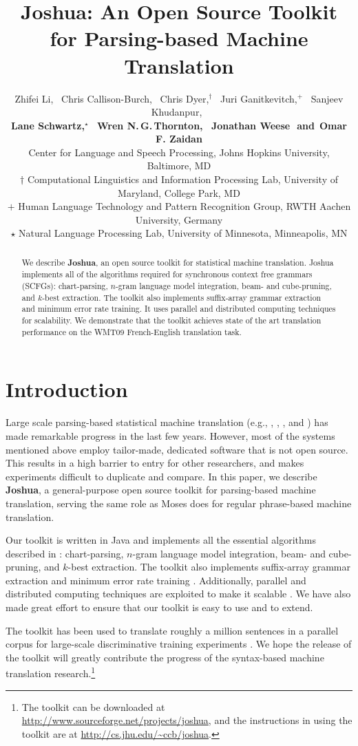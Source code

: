 \documentclass[11pt]{article}
\title{Joshua: An Open Source Toolkit for Parsing-based Machine Translation}
\author{
Zhifei Li,\,\,\,
Chris Callison-Burch,\,\,\, %
Chris Dyer,$^\dagger$\,\,\,
Juri Ganitkevitch,$^+$\,\,\,
Sanjeev Khudanpur,\,\,\, \\
{\bf Lane Schwartz,$^\star$\,\,\,
Wren N.\,G.\,Thornton,\,\,\,
Jonathan Weese\,\,
{\textnormal{and}}\,\,\,Omar F. Zaidan}\\
Center for Language and Speech Processing, Johns Hopkins University, Baltimore, MD\\
$\dagger$ Computational Linguistics and Information Processing Lab, University of Maryland, College Park, MD\\
$+$ Human Language Technology and Pattern Recognition Group, RWTH Aachen University, Germany\\
$\star$ Natural Language Processing Lab, University of Minnesota, Minneapolis, MN }
\date{}
\begin{document}
\maketitle


\begin{abstract}
We describe \textbf{Joshua}, an open source toolkit for statistical machine translation.  Joshua implements all of the algorithms required for synchronous context free grammars (SCFGs): chart-parsing, $n$-gram language model integration, beam- and cube-pruning, and $k$-best extraction. The toolkit also implements suffix-array grammar extraction and minimum error rate training. It uses parallel and distributed computing techniques for scalability. We demonstrate that the toolkit achieves state of the art translation performance on the WMT09 French-English translation task.

\end{abstract}


\section{Introduction}
Large scale parsing-based statistical machine translation (e.g., , , , and ) has made remarkable progress in the last few years.
However, most of the systems mentioned above employ tailor-made, dedicated software that is not open source.  This results in a high barrier to entry for other researchers, and makes experiments difficult to duplicate and compare.
In this paper, we describe \textbf{Joshua}, a general-purpose open source toolkit for parsing-based machine translation, serving the same role as Moses \cite{Moses} does for regular phrase-based machine translation.

Our toolkit is written in Java and implements all the essential algorithms described in : chart-parsing, $n$-gram language model integration, beam- and cube-pruning, and $k$-best extraction.  The toolkit also implements suffix-array grammar extraction \cite{Lopez2007} and minimum error rate training \cite{Och2003c}. Additionally, parallel and distributed computing techniques are exploited to make it scalable \cite{Li2008b}. We have also made great effort to ensure that our toolkit is easy to use and to extend.

The toolkit has been used to translate roughly a million sentences in a parallel corpus for large-scale discriminative training experiments \cite{Li2008}.
We hope the release of the toolkit will greatly contribute the progress of the syntax-based machine translation research.\footnote{The toolkit can be downloaded at \url{http://www.sourceforge.net/projects/joshua}, and the instructions in using the toolkit are at \url{http://cs.jhu.edu/~ccb/joshua}.}
\end{document}
